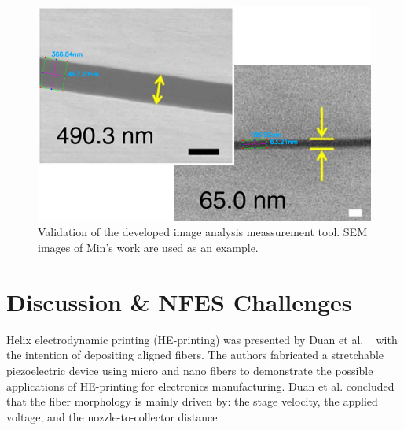 \begin{figure}[!th]
\centering
\includegraphics[scale=0.8]{./Figures/imageAnalysisToolValidation.png}
\decoRule
\caption[Validation of the developed image analysis meassurement tool]{{Validation of the developed image analysis meassurement tool. SEM images of Min's work are used as an example. \cite{Min2013}}}
\label{fig:imageAnalysisToolValidation}
\end{figure}

\section{Discussion \& NFES Challenges}

Helix electrodynamic printing (HE-printing) was presented by Duan et al. \unskip~\cite{527120:11974308} with the intention of depositing aligned fibers. The authors fabricated a stretchable piezoelectric device using micro and nano fibers to demonstrate the possible applications of HE-printing for electronics manufacturing. Duan et al. concluded that the fiber morphology is mainly driven by: the stage velocity, the applied voltage, and the nozzle-to-collector distance.


